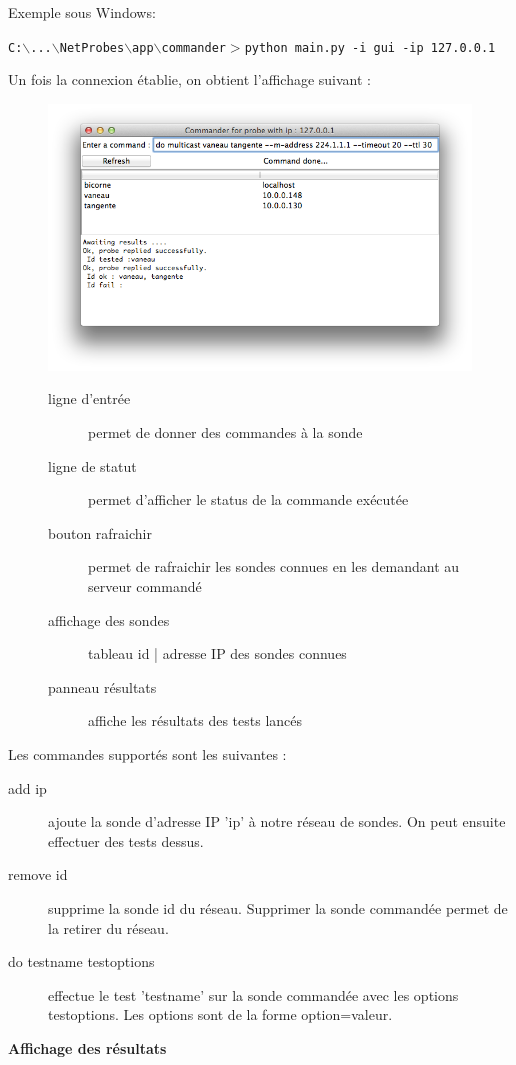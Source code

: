 \documentclass[a4paper,11pt]{article}
\begin{document}
Exemple sous Windows:
\begin{center}
\texttt{{\color{blue}C:$\backslash$...$\backslash$NetProbes$\backslash$app$\backslash$commander$>$}python main.py -i gui -ip 127.0.0.1}
\end{center} 
Un fois la connexion établie, on obtient l'affichage suivant :

\begin{figure}[!ht]
\begin{minipage}[c]{0.5\linewidth}
\centering\includegraphics[width=\linewidth]{img/commander.png}
\end{minipage}
\hfill
\begin{minipage}[c]{0.5\linewidth}
\begin{description}
\item[ligne d'entrée] permet de donner des commandes à la sonde
\item[ligne de statut] permet d'afficher le status de la commande exécutée
\item[bouton rafraichir] permet de rafraichir les sondes connues en les demandant au serveur commandé
\item[affichage des sondes] tableau id | adresse IP des sondes connues
\item[panneau résultats] affiche les résultats des tests lancés
\end{description}
\end{minipage}
\end{figure}
\FloatBarrier

Les commandes supportés sont les suivantes :
\begin{description}
\item[add ip] ajoute la sonde d'adresse IP 'ip' à notre réseau de sondes. On peut ensuite effectuer des tests dessus.
\item[remove id] supprime la sonde id du réseau. Supprimer la sonde commandée permet de la retirer du réseau.
\item[do testname testoptions] effectue le test 'testname' sur la sonde commandée avec les options testoptions. Les options sont de la forme option=valeur.
\end{description}
\vspace{2ex}
\textbf{Affichage des résultats}
\end{document}
